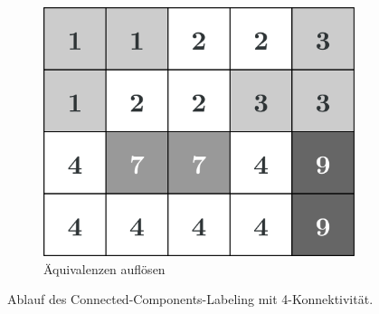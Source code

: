 \begin{figure}[H]
  \begin{subfigure}[t]{0.327\columnwidth}
    \centering
    \includegraphics[width=\columnwidth]{img/basics/connected-compontents/labeling-3}
    \caption{Äquivalenzen auflösen}
  \end{subfigure}
  \caption[Ablauf des Connected-Components-Labeling]{Ablauf des Connected-Components-Labeling mit 4-Konnektivität.}
\end{figure}

